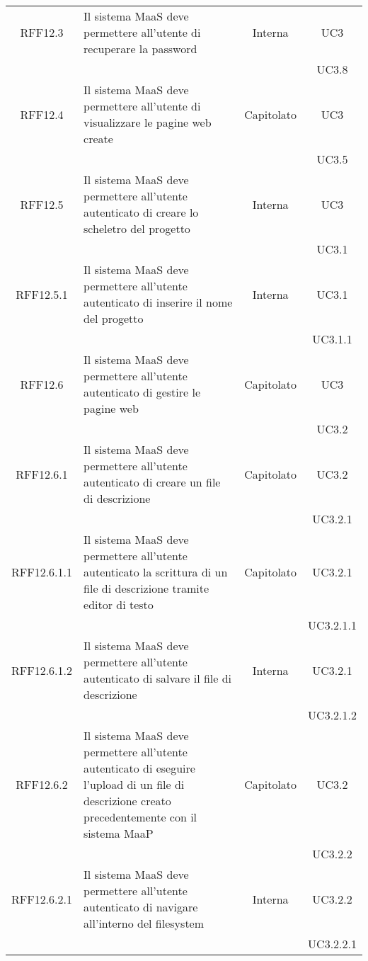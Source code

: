 \begin{longtable}{|c|p{6cm}|c|c|}
\midrule
RFF12.3
& Il sistema MaaS deve permettere all'utente di recuperare la password
& Interna
& UC3\\
& & & UC3.8\\

\midrule
RFF12.4
& Il sistema MaaS deve permettere all'utente di visualizzare le pagine web create
& Capitolato
& UC3\\
& & & UC3.5\\

\midrule
RFF12.5
& Il sistema MaaS deve permettere all'utente autenticato di creare lo scheletro del progetto
& Interna
& UC3\\
& & & UC3.1\\

\midrule
RFF12.5.1
& Il sistema MaaS deve permettere all'utente autenticato di inserire il nome del progetto
& Interna
& UC3.1\\
& & & UC3.1.1\\

\midrule
RFF12.6
& Il sistema MaaS deve permettere all'utente autenticato di gestire le pagine web
& Capitolato
& UC3\\
& & & UC3.2\\

\midrule
RFF12.6.1
& Il sistema MaaS deve permettere all'utente autenticato di creare un file di descrizione
& Capitolato
& UC3.2\\
& & & UC3.2.1\\

\midrule
RFF12.6.1.1
& Il sistema MaaS deve permettere all'utente autenticato la scrittura di un file di descrizione tramite editor di testo
& Capitolato
& UC3.2.1\\
& & & UC3.2.1.1\\

\midrule
RFF12.6.1.2
& Il sistema MaaS deve permettere all'utente autenticato di salvare il file di descrizione
& Interna
& UC3.2.1\\
& & & UC3.2.1.2\\


\midrule
RFF12.6.2
& Il sistema MaaS deve permettere all'utente autenticato di eseguire l'upload di un file di descrizione creato precedentemente con il sistema MaaP
& Capitolato
& UC3.2\\
& & & UC3.2.2\\

\midrule
RFF12.6.2.1
& Il sistema MaaS deve permettere all'utente autenticato di navigare all'interno del filesystem
& Interna
& UC3.2.2\\
& & & UC3.2.2.1\\


\end{longtable}
